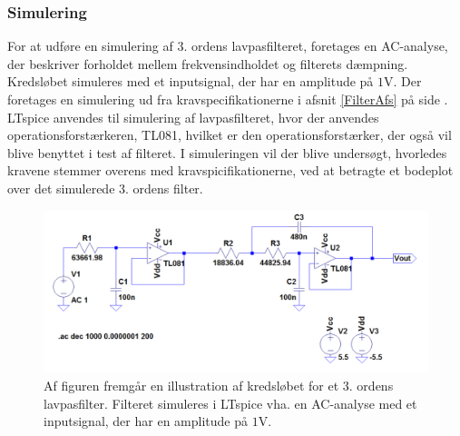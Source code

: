 \subsubsection{Simulering}
For at udføre en simulering af 3. ordens lavpasfilteret, foretages en AC-analyse, der beskriver forholdet mellem frekvensindholdet og filterets dæmpning. Kredsløbet simuleres med et inputsignal, der har en amplitude på $1$V. Der foretages en simulering ud fra kravspecifikationerne i afsnit \ref{FilterAfs} på side \pageref{FilterAfs}. LTspice anvendes til simulering af lavpasfilteret, hvor der anvendes operationsforstærkeren, TL081, hvilket er den operationsforstærker, der også vil blive benyttet i test af filteret. I simuleringen vil der blive undersøgt, hvorledes kravene stemmer overens med kravspicifikationerne, ved at betragte et bodeplot over det simulerede 3. ordens filter.

\begin{figure}[H]
	\centering
	\includegraphics[scale=0.45]{figures/cProblemloesning/Lavpasfilter_LTspice.PNG}
	\caption{Af figuren fremgår en illustration af kredsløbet for et 3. ordens lavpasfilter. Filteret simuleres i LTspice vha. en AC-analyse med et inputsignal, der har en amplitude på $1$V.}
	\label{fig:lavpasfilter_LTspice}
\end{figure}


